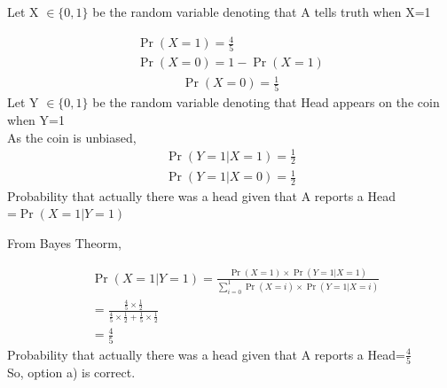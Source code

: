 Let X $\in\{0,1\}$ be the random variable denoting that A tells truth when X=1

\begin{align*}
\tag{1.14.1}
     \Pr(X=1)=\frac{4}{5}\\
      \Pr(X=0)=1-\Pr(X=1)
\end{align*}
\begin{align}
\tag{1.14.2}
    \Pr(X=0) =\frac{1}{5}
\end{align}
Let Y $\in\{0,1\}$ be the random variable denoting that Head appears on the coin when Y=1 \\
As the coin is unbiased,\\
\begin{align}
\tag{1.14.3}
    \Pr(Y=1|X=1)=\frac{1}{2}
\end{align}
\begin{align}
\tag{1.14.4}
    \Pr(Y=1|X=0)=\frac{1}{2}
\end{align}
Probability that actually there was a head given that A reports a Head\\
=$\Pr(X=1|Y=1)$

From Bayes Theorm,

\begin{align*}
    &\Pr(X=1|Y=1)=\frac{\Pr(X=1)\times\Pr(Y=1|X=1)}{\sum_{i=0}^{1}\Pr(X=i)\times\Pr(Y=1|X=i)}\\
   &=\frac{\frac{4}{5}\times\frac{1}{2}}{\frac{4}{5}\times\frac{1}{2}+\frac{1}{5}\times\frac{1}{2}}\\
    &=\frac{4}{5}
\end{align*}
Probability that  actually there was a head given that A reports a Head=$\frac{4}{5}$\\
So, option a) is correct.